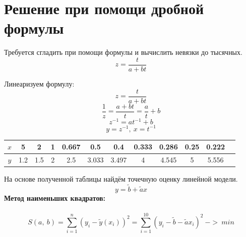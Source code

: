 \documentclass{article}
\begin{document}
\section*{Решение при помощи дробной формулы}
Требуется сгладить при помощи формулы и вычислить невязки до тысячных.
\[ z = \frac{t}{a + bt} \]

Линеаризуем формулу:
\[z =\frac{t}{a+bt}\]
\[\frac{1}{z} = \frac{a+bt}{t} = \frac{a}{t} + b\]
\[z^{-1} = at^{-1}+b\]
\[y = z^{-1},\ x = t^{-1}\]
\begin{table}[H]
    \centering
    \begin{tabular}{|c|*{11}{c|}}
        \hline
        \(x\) & 5 & 2 & 1 & 0.667 & 0.5 & 0.4 & 0.333 & 0.286 & 0.25 & 0.222 \\
        \hline
        \(y\) & 1.2 & 1.5 & 2 & 2.5& 3.033 & 3.497 & 4 & 4.545 & 5 & 5.556 \\
        \hline
    \end{tabular}
\end{table}
На основе полученной таблицы найдём точечную оценку линейной модели.
\[
y = \tilde{b} + \tilde{a} x
\]
\textbf{Метод наименьших квадратов:}
\\ \\
\[S(a,\ b) = \sum_{i=1}^{n}(y_i - \tilde{y}(x_i))^2 = \sum_{i=1}^{10}(y_i - \tilde{b} - \tilde{a}x_i)^2\ ->\ min\]
\end{document}
